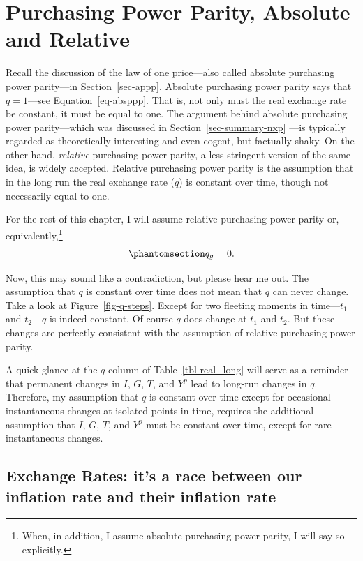 \documentclass[
  letterpaper,
]{book}
\theoremstyle{plain}
\theoremstyle{remark}
\begin{document}
\section{Purchasing Power Parity, Absolute and Relative}\label{sec-rppp}

Recall the discussion of the law of one price---also called absolute
purchasing power parity---in Section~\ref{sec-appp}. Absolute purchasing
power parity says that \(q=1\)---see Equation~\ref{eq-absppp}. That is,
not only must the real exchange rate be constant, it must be equal to
one. The argument behind absolute purchasing power parity---which was
discussed in Section~\ref{sec-summary-nxp} ---is typically regarded as
theoretically interesting and even cogent, but factually shaky. On the
other hand, \emph{relative} purchasing power parity, a less stringent
version of the same idea, is widely accepted. Relative purchasing power
parity is the assumption that in the long run the real exchange rate
(\(q\)) is constant over time, though not necessarily equal to one.

For the rest of this chapter, I will assume relative purchasing power
parity or, equivalently,\footnote{When, in addition, I assume absolute
  purchasing power parity, I will say so explicitly.}
\begin{equation}\phantomsection\label{eq-qgLR}{
q_g=0.
}\end{equation}

Now, this may sound like a contradiction, but please hear me out. The
assumption that \(q\) is constant over time does not mean that \(q\) can
never change. Take a look at Figure~\ref{fig-q-steps}. Except for two
fleeting moments in time---\(t_1\) and \(t_2\)---\(q\) is indeed
constant. Of course \(q\) does change at \(t_1\) and \(t_2\). But these
changes are perfectly consistent with the assumption of relative
purchasing power parity.

A quick glance at the \(q\)-column of Table~\ref{tbl-real_long} will
serve as a reminder that permanent changes in \(I\), \(G\), \(T\), and
\(Y^p\) lead to long-run changes in \(q\). Therefore, my assumption that
\(q\) is constant over time except for occasional instantaneous changes
at isolated points in time, requires the additional assumption that
\(I\), \(G\), \(T\), and \(Y^p\) must be constant over time, except for
rare instantaneous changes.

\subsection{Exchange Rates: it's a race between our inflation rate and
their inflation rate}\label{sec-E-pi-race}
\end{document}
